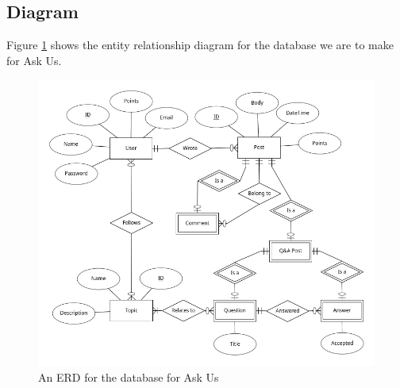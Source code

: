 \subsection{Diagram}

Figure \ref{erd} shows the entity relationship diagram for the database we are to make for Ask Us.

\begin{figure}[htb]
	\centering
	\includegraphics[width=\linewidth]{../ERD/erd.png}
	\caption{An ERD for the database for Ask Us}
	\label{erd}
\end{figure}

